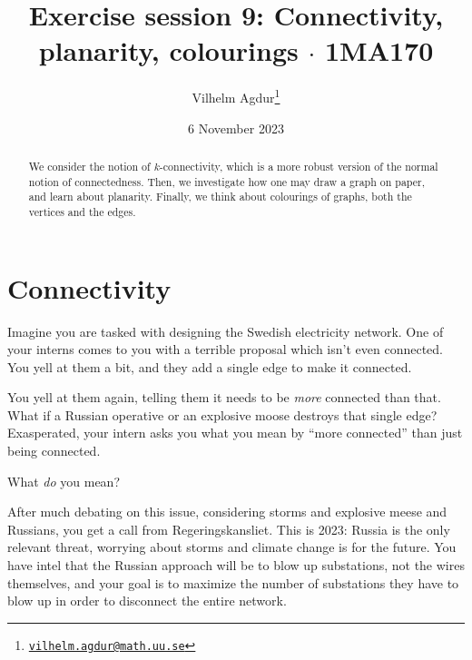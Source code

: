 \documentclass[nobib]{tufte-handout}
\title{Exercise session 9: Connectivity, planarity, colourings $\cdot$ 1MA170}
\author[Vilhelm Agdur]{Vilhelm Agdur\thanks{\href{mailto:vilhelm.agdur@math.uu.se}{\nolinkurl{vilhelm.agdur@math.uu.se}}}}
\date{6 November 2023}
\begin{document}
\maketitle%

\begin{abstract}
\noindent
We consider the notion of $k$-connectivity, which is a more robust version of the normal notion of connectedness. Then, we investigate how one may draw a graph on paper, and learn about planarity. Finally, we think about colourings of graphs, both the vertices and the edges.
\end{abstract}

\section{Connectivity}

Imagine you are tasked with designing the Swedish electricity network. One of your interns comes to you with a terrible proposal which isn't even connected. You yell at them a bit, and they add a single edge to make it connected.

You yell at them again, telling them it needs to be \emph{more} connected than that. What if a Russian operative or an explosive moose destroys that single edge? Exasperated, your intern asks you what you mean by ``more connected'' than just being connected.

\begin{xca}
  What \emph{do} you mean?
\end{xca}

After much debating on this issue, considering storms and explosive meese and Russians, you get a call from Regeringskansliet. This is 2023: Russia is the only relevant threat, worrying about storms and climate change is for the future. You have intel that the Russian approach will be to blow up substations, not the wires themselves, and your goal is to maximize the number of substations they have to blow up in order to disconnect the entire network.
\end{document}
